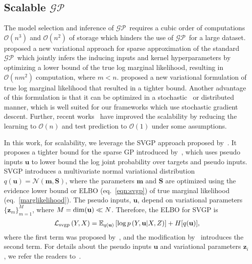 \documentclass{article} \usepackage{iclr2021_conference,times}
\newcommand{\GP}{$\mathcal{GP}$}
\newcommand{\bu}{\mathbf{u}}
\newcommand{\bz}{\mathbf{z}}
\newcommand{\EE}{\mathbb{E}}
\newcommand{\NN}{\mathcal{N}}
\newcommand{\bmm}{\mathbf{m}}
\newcommand{\bS}{\mathbf{S}}
\begin{document}
\vspace{-0.05in}
\subsection{Scalable \GP}
\vspace{-0.05in}
The model selection and inference of \GP\ requires a cubic order of computations $\mathcal{O}(n^3)$ and $\mathcal{O}(n^2)$ of storage which hinders the use of \GP\ for a large dataset. 
\citet{pmlr-v5-titsias09a} proposed a new variational approach for sparse approximation of the standard \GP\, which jointly infers the inducing inputs and kernel hyperparameters by optimizing a lower bound of the true log marginal likelihood, resulting in $\mathcal{O}(nm^2)$ computation, where $m<n$. \citet{hensman2013gaussian} proposed a new variational formulation of true log marginal likelihood that resulted in a tighter bound. Another advantage of this formulation is that it can be optimized in a stochastic~\citep{hensman2013gaussian} or distributed~\citep{dai2014gaussian,gal2014distributed} manner, which is well suited for our frameworks which use stochastic gradient descent. Further, recent works~\citep{wilson2015kernel,wilson2015thoughts,wilson2016stochastic} have improved the scalability by reducing the learning to $\mathcal{O}(n)$ and test prediction to $\mathcal{O}(1)$ under some assumptions. 

In this work, for scalability, we leverage the SVGP approach proposed by~\citet{hensman2013gaussian}. It proposes a tighter bound for the sparse GP introduced by~\citet{pmlr-v5-titsias09a}, which uses pseudo inputs $\bu$ to lower bound the log joint probability over targets and pseudo inputs. SVGP introduces a multivariate normal variational distribution $q(\bu) = \NN(\bmm, \bS)$, where the parameters $\bmm$ and $\bS$ are optimized using the evidence lower bound or ELBO (eq.~\ref{eqn:svgp}) of true marginal likelihood (eq.~\ref{marglikelihood}). The pseudo inputs, $\bu$, depend on variational parameters $\{ \bz_m \}_{m=1}^{M}$, where $M={\rm dim}(\bu) \ll N$. Therefore, the ELBO for SVGP is
\begin{align}
\mathcal{L}_{\rm svgp} \left( Y,X \right) = \EE_{q(\bu)} \left[ \log p\left(Y, \bu |X, Z\right) \right] + H[q(\bu)], \label{eqn:svgp}
\end{align}
where the first term was proposed by~\citet{pmlr-v5-titsias09a}, and the modification by~\citet{hensman2013gaussian} introduces the second term. For details about the pseudo inputs $\bu$ and variational parameters $\bz_i$, we refer the readers to~\citep{pmlr-v5-titsias09a,hensman2013gaussian}. 
\end{document}
